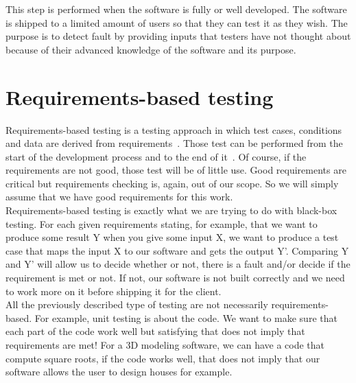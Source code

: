 \documentclass[12pt]{article}
\theoremstyle{definition}
\theoremstyle{definition}
\theoremstyle{remark}
\begin{document}
This step is performed when the software is fully or well developed. The software is shipped to a limited amount of users so that they can test it as they wish. The purpose is to detect fault by providing inputs that testers have not thought about because of their advanced knowledge of the software and its purpose.



\section{Requirements-based testing}


Requirements-based testing is a testing approach in which test cases, conditions and data are derived from requirements~\cite{IBMRequirementBasedTesting:2017}. Those test can be performed from the start of the development process and to the end of it~\cite{BenderRBTRequirementBasedTesting:2017}. Of course, if the requirements are not good, those test will be of little use. Good requirements are critical but requirements checking is, again, out of our scope. So we will simply assume that we have good requirements for this work.\\

Requirements-based testing is exactly what we are trying to do with black-box testing. For each given requirements stating, for example, that we want to produce some result Y when you give some input X, we want to produce a test case that maps the input X to our software and gets the output Y'. Comparing Y and Y' will allow us to decide whether or not, there is a fault and/or decide if the requirement is met or not. If not, our software is not built correctly and we need to work more on it before shipping it for the client.\\

All the previously described type of testing are not necessarily requirements-based. For example, unit testing is about the code. We want to make sure that each part of the code work well but satisfying that does not imply that requirements are met! For a 3D modeling software, we can have a code that compute square roots, if the code works well, that does not imply that our software allows the user to design houses for example.\\


\end{document}
